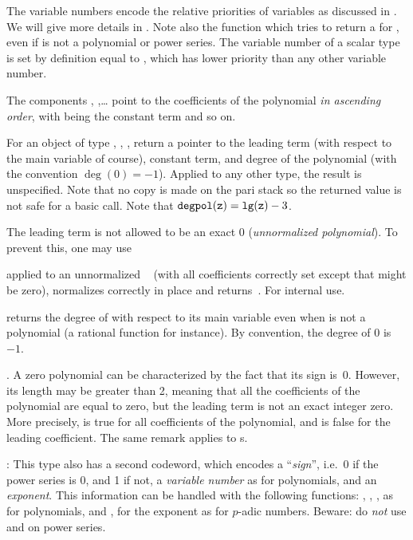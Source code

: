 The variable numbers encode the relative priorities of variables as discussed
in . We will give more details in . Note
also the function  which tries to return a
 for , even if  is not a polynomial or
power series. The variable number of a scalar type is set by definition equal
to , which has lower priority than any other variable number.

The components , ,\dots {} point to the
coefficients of the polynomial \emph{in ascending order}, with 
being the constant term and so on.

For an object of type , , ,
 return a pointer to the leading term (with respect to the main
variable of course), constant term, and degree of the polynomial (with the
convention $\deg(0) = -1$). Applied to any other type, the result is
unspecified. Note that no copy is made on the pari stack so the returned
value is not safe for a basic  call. Note that ${\tt degpol(z)}
= {\tt lg(z)} - 3$.

The leading term is not allowed to be an exact $0$ (\emph{unnormalized
polynomial}). To prevent this, one may use

 applied to an unnormalized ~
(with all coefficients correctly set except that  might
be zero), normalizes  correctly in place and returns~. For
internal use.

 returns the degree of  with respect to its
main variable even when  is not a polynomial (a rational function for
instance). By convention, the degree of $0$ is~$-1$.

. A zero polynomial can be characterized by the
fact that its sign is~0. However, its length may be greater than 2, meaning
that all the coefficients of the polynomial are equal to zero, but the
leading term  is not an exact integer zero. More precisely,
 is true for all coefficients  of the polynomial,
and  is false for the leading coefficient. The same
remark applies to s.

:
This type also has a second codeword, which encodes a ``\emph{sign}'', i.e.~0
if the power series is 0, and 1 if not, a \emph{variable number} as for
polynomials, and an \emph{exponent}. This information can be handled with the
following functions: , , , 
as for polynomials, and ,  for the exponent as for
$p$-adic numbers. Beware: do \emph{not} use  and  on
power series.

